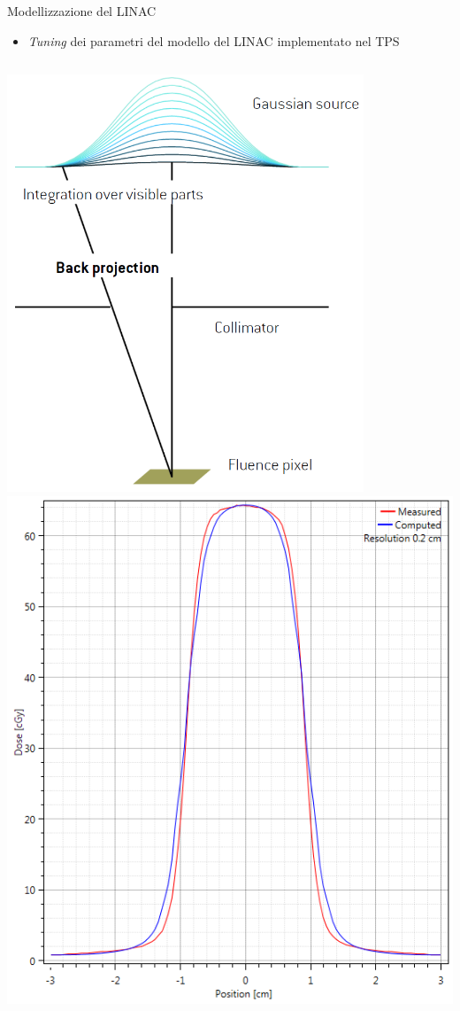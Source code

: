 \documentclass{beamer}
\begin{document}
\begin{frame}[t]{Modellizzazione del LINAC}
\begin{itemize}
\scriptsize
{}
\item \alert{\textit{Tuning} dei parametri del modello del LINAC implementato nel TPS}
\end{itemize}
\begin{columns}[t]
\centering
\includegraphics[width=0.8\textwidth]{./img/source_int.png}
\includegraphics[width=\textwidth]{./img/Ray_penumbra_wrong.PNG}
\centering
\end{columns}
\end{frame}
\end{document}
